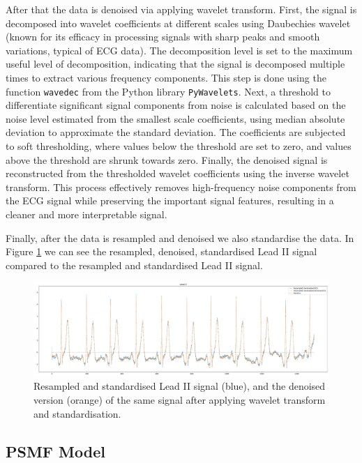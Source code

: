 \documentclass{mldsmsc}
\begin{document}
\noindent After that the data is denoised via applying wavelet transform. First, the signal is decomposed into wavelet coefficients at different scales using Daubechies wavelet (known for its efficacy in processing signals with sharp peaks and smooth variations, typical of ECG data). The decomposition level is set to the maximum useful level of decomposition, indicating that the signal is decomposed multiple times to extract various frequency components. This step is done using the function \texttt{wavedec} from the Python library \texttt{PyWavelets}. Next, a threshold to differentiate significant signal components from noise is calculated based on the noise level estimated from the smallest scale coefficients, using median absolute deviation to approximate the standard deviation. The coefficients are subjected to soft thresholding, where values below the threshold are set to zero, and values above the threshold are shrunk towards zero. Finally, the denoised signal is reconstructed from the thresholded wavelet coefficients using the inverse wavelet transform. This process effectively removes high-frequency noise components from the ECG signal while preserving the important signal features, resulting in a cleaner and more interpretable signal. \newline

\noindent Finally, after the data is resampled and denoised we also standardise the data. In Figure \ref{fig:res-st-den-ecg} we can see the resampled, denoised, standardised Lead II signal compared to the resampled and standardised Lead II signal.

\begin{figure}[H]
\centering
\includegraphics[width=1\linewidth]{images/r_peaks/resampled_standardised_denoised_ecg_m.pdf}
\caption{Resampled and standardised Lead II signal (blue), and the denoised version (orange) of the same signal after applying wavelet transform and standardisation.}
\label{fig:res-st-den-ecg}
\end{figure}

\subsection{PSMF Model}
\end{document}
